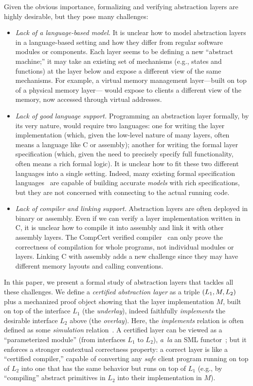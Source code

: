Given the obvious importance, formalizing and verifying abstraction 
layers are highly desirable, but they pose many challenges:
\begin{itemize} \itemsep 0pt
\item
{\em Lack of a language-based model.}  It is unclear how to
  model abstraction layers in a language-based setting and how they
  differ from regular software modules or components.  Each layer
  seems to be defining a new ``abstract machine;'' it may take an
  existing set of mechanisms (e.g., states and functions) at the layer
  below and expose a different view of the same mechanisms. For
  example, a virtual memory management layer---built on top of a
  physical memory layer--- would expose to clients a different view of
  the memory, now accessed through virtual addresses.
\item {\em Lack of good language support.} Programming an abstraction
  layer formally, by its very nature, would require two languages: one
  for writing the layer implementation (which, given the low-level
  nature of many layers, often means a language like C or assembly);
  another for writing the formal layer specification (which, given the
  need to precisely specify full functionality, often means a rich
  formal logic). It is unclear how to fit these two different
  languages into a single setting. Indeed, many existing formal
  specification languages~\cite{znot92,lamport94,jackson12} are
  capable of building accurate {\em models} with rich specifications,
  but they are not concerned with connecting to the actual running code.
\item {\em Lack of compiler and linking support.} Abstraction layers
  are often deployed in binary or assembly. Even if we can verify a
  layer implementation written in C, it is unclear how to compile it
  into assembly and link it with other assembly layers. The CompCert
  verified compiler~\cite{compcert} can only prove the correctness of
  compilation for whole programs, not individual modules or
  layers. Linking C with assembly adds a new challenge since they may
  have different memory layouts and calling conventions.
\end{itemize}

In this paper, we present a formal study of abstraction layers that
tackles all these challenges. We define a {\em certified abstraction
  layer} as a triple $(L_1,M,L_2)$ plus a mechanized proof
object showing that the layer implementation $M$, built on top of the
interface $L_1$ (the {\em underlay}), indeed faithfully {\em
  implements} the desirable interface $L_2$ above (the {\em overlay}).
Here, the {\em implements} relation is often defined as some
{\em simulation} relation~\cite{Lynch95}.  A certified layer can be
viewed as a ``parameterized module'' (from interfaces $L_1$ to $L_2$),
{\em a~la} an SML functor~\cite{milner97}; but it enforces a stronger
contextual correctness property: a correct layer is like a
``certified compiler,'' capable of converting any {\em safe} client program
running on top of $L_2$ into one that has the same behavior but runs
on top of $L_1$ (e.g., by ``compiling'' abstract primitives in $L_2$ into
their implementation in $M$). 

